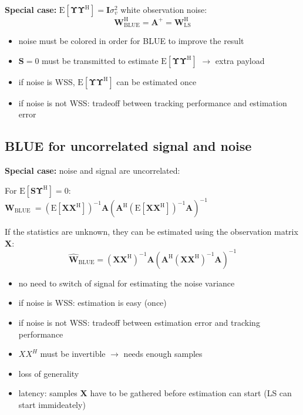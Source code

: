 \documentclass[english]{latex4ei/latex4ei_sheet}
\begin{document}
\begin{sectionbox}
  \textbf{Special case:} $\mathrm{E}\left[\boldsymbol{\Upsilon} \boldsymbol{\Upsilon}^{\mathrm{H}}\right]=\mathbf{I} \sigma_{v}^{2}$ white observation noise:
  $$\boldsymbol{W}_{\mathrm{BLUE}}^{\mathrm{H}}=\boldsymbol{A}^{+}=\boldsymbol{W}_{\mathrm{LS}}^{\mathrm{H}}$$
  \begin{itemize}
    \item noise must be colored in order for BLUE to improve the result
    \item $\boldsymbol{S}=0$ must be transmitted to estimate $\mathrm{E}\left[\boldsymbol{\Upsilon} \boldsymbol{\Upsilon}^{\mathrm{H}}\right]$ $\rightarrow$ extra payload
    \item if noise is WSS, $\mathrm{E}\left[\boldsymbol{\Upsilon} \boldsymbol{\Upsilon}^{\mathrm{H}}\right]$ can be estimated once
    \item if noise is not WSS: tradeoff between tracking performance and estimation error
  \end{itemize}
  

\end{sectionbox}


\begin{sectionbox}
  \subsection{BLUE for uncorrelated signal and noise}
\textbf{Special case:} noise and signal are uncorrelated:
\begin{emphbox}
  For $\mathrm{E}\left[\boldsymbol{S} \boldsymbol{\Upsilon}^{\mathrm{H}}\right] = 0$:\\
  $\boldsymbol{W}_{\text {BLUE }}=\left(\mathrm{E}\left[\boldsymbol{X} \boldsymbol{X}^{\mathrm{H}}\right]\right)^{-1} \boldsymbol{A}\left(\boldsymbol{A}^{\mathrm{H}}\left(\mathrm{E}\left[\boldsymbol{X} \boldsymbol{X}^{\mathrm{H}}\right]\right)^{-1} \boldsymbol{A}\right)^{-1}$
\end{emphbox}

If the statistics are unknown, they can be estimated using the observation matrix $\boldsymbol{X}$:
$$\widehat{\boldsymbol{W}}_{\mathrm{BLUE}}=\left(\boldsymbol{X} \boldsymbol{X}^{\mathrm{H}}\right)^{-1} \boldsymbol{A}\left(\boldsymbol{A}^{\mathrm{H}}\left(\boldsymbol{X} \boldsymbol{X}^{\mathrm{H}}\right)^{-1} \boldsymbol{A}\right)^{-1}$$
\begin{itemize}
  \item no need to switch of signal for estimating the noise variance
  \item if noise is WSS: estimation is easy (once)
  \item if noise is not WSS: tradeoff between estimation error and tracking performance
  \item $XX^H$ must be invertible $\rightarrow$ needs enough samples 
  \item loss of generality
  \item latency: samples $\boldsymbol{X}$ have to be gathered before estimation can start (LS can start immideately)
\end{itemize}
\end{sectionbox}
\end{document}
